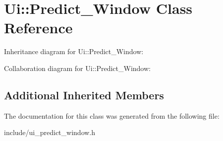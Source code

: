 \hypertarget{classUi_1_1Predict__Window}{}\section{Ui\+:\+:Predict\+\_\+\+Window Class Reference}
\label{classUi_1_1Predict__Window}


Inheritance diagram for Ui\+:\+:Predict\+\_\+\+Window\+:


Collaboration diagram for Ui\+:\+:Predict\+\_\+\+Window\+:
\subsection*{Additional Inherited Members}


The documentation for this class was generated from the following file\+:\begin{DoxyCompactItemize}
\item 
include/ui\+\_\+predict\+\_\+window.\+h\end{DoxyCompactItemize}
